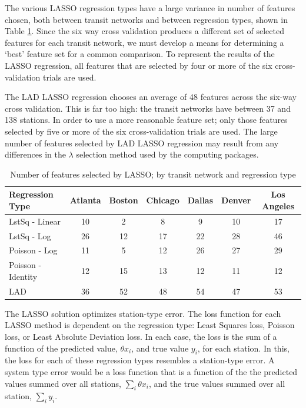 \documentclass[11pt]{article}
\begin{document}
The various LASSO regression types have a large variance in number of features chosen, both between transit networks and between regression types, shown in Table \ref{tab:lassoFeatNum}. Since the six way cross validation produces a different set of selected features for each transit network, we must develop a means for determining a `best' feature set for a common comparison. To represent the results of the LASSO regression, all features that are selected by four or more of the six cross-validation trials are used. 

The LAD LASSO regression chooses an average of 48 features across the six-way cross validation. This is far too high: the transit networks have between 37 and 138 stations. In order to use a more reasonable feature set; only those features selected by five or more of the six cross-validation trials are used. The large number of features selected by LAD LASSO regression may result from any differences in the $\lambda$ selection method used by the computing packages. 

\begin{table}[H]
\begingroup\fontsize{10}{15}\selectfont
\centering
\begin{tabular}{l|cccccc}
Regression Type&Atlanta&Boston&Chicago&Dallas&Denver&Los Angeles\\
\midrule
LstSq - Linear&10&2&8&9&10&17\\
LstSq - Log&26&12&17&22&28&46\\
Poisson - Log&11&5&12&26&27&29\\
Poisson - Identity&12&15&13&12&11&12\\
LAD&36&52&48&54&47&53\\
\end{tabular}
\caption{Number of features selected by LASSO; by transit network and regression type}\label{tab:lassoFeatNum}
\endgroup
\end{table}

The LASSO solution optimizes station-type error. The loss function for each LASSO method is dependent on the regression type: Least Squares loss, Poisson loss, or Least Absolute Deviation loss. In each case, the loss is the sum of a function of the predicted value, $\theta x_i$, and true value $y_i$, for each station. In this, the loss for each of these regression types resembles a station-type error. A system type error would be a loss function that is a function of the the predicted values summed over all stations, $\sum_i \theta x_i$, and the true values summed over all station, $\sum_i y_i$.
\end{document}
